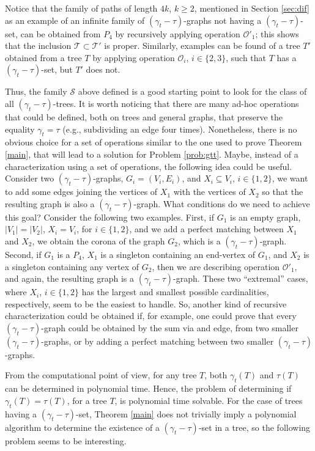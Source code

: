\documentclass[12pt]{article}%
\theoremstyle{definition}
\newcommand{\gtt}{$(\gamma_t - \tau)$}
\begin{document}
Notice that the family of paths of length $4k$,
$k \ge 2$, mentioned in Section \ref{sec:dif}
as an example of an infinite family of \gtt-graphs
not having a \gtt-set, can be obtained from $P_4$
by recursively applying operation $\mathcal{O}'_1$;
this shows that the inclusion $\mathcal{T} \subset
\mathcal{T}'$ is proper.   Similarly, examples can
be found of a tree $T'$ obtained from a tree $T$
by applying operation $\mathcal{O}_i$, $i \in \{ 2, 3
\}$, such that $T$ has a \gtt-set, but $T'$ does not.

Thus, the family $\mathcal{S}$ above defined is
a good starting point to look for the class of all
\gtt-trees.   It is worth noticing that there are many
ad-hoc operations that could be defined, both on
trees and general graphs, that preserve the
equality $\gamma_t = \tau$ (e.g., subdividing an
edge four times).   Nonetheless, there is no obvious
choice for a set of operations similar to the one
used to prove Theorem \ref{main}, that will lead
to a solution for Problem \ref{prob:gtt}.   Maybe,
instead of a characterization using a set of operations,
the following idea could be useful.   Consider two
\gtt-graphs, $G_i = (V_i, E_i)$, and $X_i \subseteq
V_i$, $i \in \{ 1, 2 \}$, we want to add some edges
joining the vertices of $X_1$ with the vertices of
$X_2$ so that the resulting graph is also a \gtt-graph.
What conditions do we need to achieve this goal?
Consider the following two examples.   First, if
$G_1$ is an empty graph, $|V_1| = |V_2|$, $X_i =
V_i$, for $i \in \{ 1, 2 \}$, and we add a perfect
matching between $X_1$ and $X_2$, we obtain
the corona of the graph $G_2$, which is a \gtt-graph.
Second, if $G_1$ is a $P_4$, $X_1$ is a singleton
containing an end-vertex of $G_1$, and $X_2$ is
a singleton containing any vertex of $G_2$, then
we are describing operation $\mathcal{O}'_1$, and
again, the resulting graph is a \gtt-graph.    These
two ``extremal'' cases, where $X_i$, $i \in \{ 1, 2 \}$
has the largest and smallest possible cardinalities,
respectively, seem to be the easiest to handle.   So,
another kind of recursive characterization could be
obtained if, for example, one could prove that every
\gtt-graph could be obtained by the sum via and
edge, from two smaller \gtt-graphs, or by adding
a perfect matching between two smaller \gtt-graphs.

From the computational point of view, for any tree $T$, both
$\gamma_t (T)$ and $\tau (T)$ can be determined in polynomial
time.   Hence, the problem of determining if $\gamma_t (T) = \tau
(T)$, for a tree $T$, is polynomial time solvable.   For the case of
trees having a \gtt-set, Theorem \ref{main} does not trivially
imply a polynomial algorithm to determine the existence of a
\gtt-set in a tree, so the following problem seems to be interesting.
\end{document}
